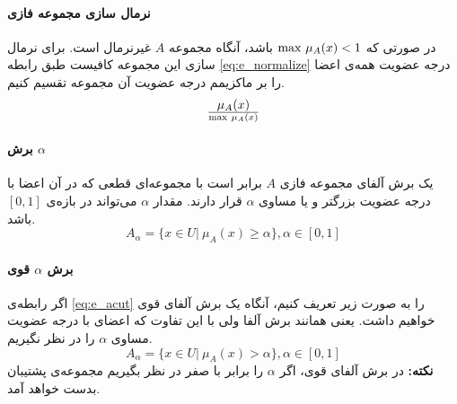 \paragraph{نرمال سازی مجموعه فازی}
در صورتی که 
$ {\rm max}\ \mu_{A}(x) < 1$
باشد، آنگاه مجموعه $A$ غیرنرمال است. برای نرمال سازی این مجموعه کافیست طبق رابطه 
\ref{eq:e_normalize}
درجه عضویت همه‌ی اعضا را بر ماکزیمم درجه عضویت آن مجموعه تقسیم کنیم.
\begin{equation}\label{eq:e_normalize}
	\mu_{A}(x) \over {{\rm max}\ \mu_{A}(x)}
\end{equation}
\paragraph{برش $\alpha$}
یک برش آلفای 
مجموعه‌ فازی $A$ برابر است با مجموعه‌ای قطعی که در آن اعضا با درجه عضویت بزرگتر و یا مساوی $\alpha$ قرار دارند. مقدار $\alpha$ می‌تواند در بازه‌ی 
$[0,1]$
باشد. 
\begin{equation}\label{eq:e_acut}
	A_{\alpha}=\{ x \in U |\ \mu_{A}(x) \ge \alpha \}, \alpha \in [0,1]
\end{equation}
\paragraph{برش $\alpha$ قوی}
اگر رابطه‌ی 
\ref{eq:e_acut}
را به صورت زیر تعریف کنیم، آنگاه یک برش آلفای قوی خواهیم داشت. یعنی همانند برش آلفا ولی با این تفاوت که اعضای با درجه عضویت مساوی $\alpha$ را در نظر نگیریم.
\begin{equation}\label{eq:e_acuta}
A_{\alpha}=\{ x \in U |\ \mu_{A}(x) > \alpha \}, \alpha \in [0,1]
\end{equation}
\textbf{نکته:}
در برش آلفای قوی، اگر $\alpha$ را برابر با صفر در نظر بگیریم مجموعه‌ی پشتیبان بدست خواهد آمد.
